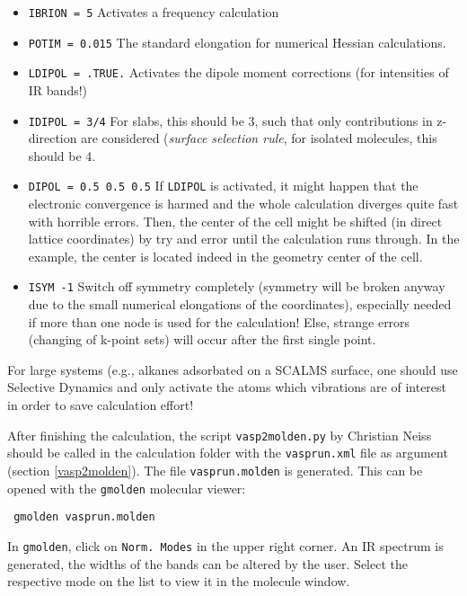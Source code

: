 \documentclass[a4paper,11pt]{article}
\begin{document}
\begin{itemize}
 \item \texttt{IBRION = 5} Activates a frequency calculation
 \item \texttt{POTIM = 0.015} The standard elongation for numerical Hessian calculations.
 \item \texttt{LDIPOL = .TRUE.} Activates the dipole moment corrections (for intensities
 of IR bands!)
 \item \texttt{IDIPOL = 3/4} For slabs, this should be 3, such that only contributions 
 in z-direction are considered (\textit{surface selection rule}, for isolated molecules,
 this should be 4.
 \item \texttt{DIPOL = 0.5 0.5 0.5} If \texttt{LDIPOL} is activated, it might happen that
 the electronic convergence is harmed and the whole calculation diverges quite fast with horrible errors.
 Then, the center of the cell might be shifted (in direct lattice coordinates) by try
 and error until the calculation runs through. In the example, the center is located
 indeed in the geometry center of the cell.
 \item \texttt{ISYM  -1} Switch off symmetry completely (symmetry will be broken anyway due to the small numerical
 elongations of the coordinates), especially needed if more than
 one node is used for the calculation! Else, strange errors (changing of k-point sets)
 will occur after the first single point.
\end{itemize}

For large systems (e.g., alkanes adsorbated on a SCALMS surface, one should use Selective 
Dynamics and only activate the atoms which vibrations are of interest in order to
save calculation effort!

After finishing the calculation, the script \texttt{vasp2molden.py} by Christian Neiss 
should be called in the calculation folder with the \texttt{vasprun.xml} file as argument (section \ref{vasp2molden}).
The file \texttt{vasprun.molden} is generated. 
This can be opened with the \texttt{gmolden} molecular viewer:

\begin{verbatim}
 gmolden vasprun.molden
\end{verbatim}

In \texttt{gmolden}, click on \texttt{Norm. Modes} in the upper right corner. An IR spectrum
is generated, the widths of the bands can be altered by the user. 
Select the respective mode on the list to view it in the molecule window.
\end{document}

